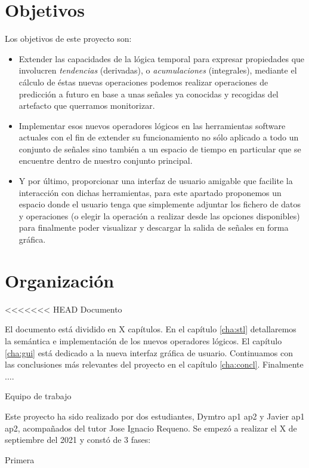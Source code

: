 \section{Objetivos}

Los objetivos de este proyecto son:

\begin{itemize}
\item Extender las capacidades de la lógica temporal para expresar propiedades que involucren \textit{tendencias} (derivadas), o \textit{acumulaciones} (integrales), mediante el cálculo de éstas nuevas operaciones podemos realizar operaciones de predicción a futuro en base a unas señales ya conocidas y recogidas del artefacto que querramos monitorizar.   
\item Implementar esos nuevos operadores lógicos en las herramientas software actuales con el fin de extender su funcionamiento no sólo aplicado a todo un conjunto de señales sino también a un espacio de tiempo en particular que se encuentre dentro de nuestro conjunto principal. 
\item Y por último, proporcionar una interfaz de usuario amigable que facilite la interacción con dichas herramientas, para este apartado  proponemos un espacio donde el usuario tenga que simplemente adjuntar los fichero de datos y operaciones (o elegir la operación a realizar desde las opciones disponibles) para finalmente poder visualizar y descargar la salida de señales en forma gráfica. 
\end{itemize}

\section{Organización}

<<<<<<< HEAD
Documento

El documento está dividido en X capítulos. En el capítulo \ref{cha:stl} detallaremos la semántica e implementación de los nuevos operadores lógicos. El capítulo \ref{cha:gui} está dedicado a la nueva interfaz gráfica de usuario. Continuamos con las conclusiones más relevantes del proyecto en el capítulo \ref{cha:concl}. Finalmente $\ldots$.

Equipo de trabajo 

Este proyecto ha sido realizado por dos estudiantes, Dymtro ap1 ap2 y Javier ap1 ap2, acompañados del tutor Jose Ignacio Requeno. Se empezó a realizar el X de septiembre del 2021 y constó de 3 fases: 

Primera 

